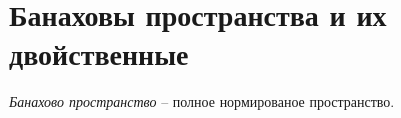 \section{Банаховы пространства и их двойственные}


\begin{to_def}
    \textit{Банахово пространство} -- полное нормированое пространство. 
\end{to_def}









